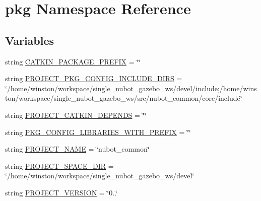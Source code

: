 \hypertarget{namespacepkg}{\section{pkg Namespace Reference}
\label{namespacepkg}
}
\subsection*{Variables}
\begin{DoxyCompactItemize}
\item 
string \hyperlink{namespacepkg_ae26c7a5a06b7d738f4d210ca449e6bee}{C\-A\-T\-K\-I\-N\-\_\-\-P\-A\-C\-K\-A\-G\-E\-\_\-\-P\-R\-E\-F\-I\-X} = \char`\"{}\char`\"{}
\item 
string \hyperlink{namespacepkg_a2760bf8266ff58da440f65ee91b203ab}{P\-R\-O\-J\-E\-C\-T\-\_\-\-P\-K\-G\-\_\-\-C\-O\-N\-F\-I\-G\-\_\-\-I\-N\-C\-L\-U\-D\-E\-\_\-\-D\-I\-R\-S} = \char`\"{}/home/winston/workspace/single\-\_\-nubot\-\_\-gazebo\-\_\-ws/devel/include;/home/winston/workspace/single\-\_\-nubot\-\_\-gazebo\-\_\-ws/src/nubot\-\_\-common/core/include\char`\"{}
\item 
string \hyperlink{namespacepkg_a17c18447fad253ee1c0d76deec88028c}{P\-R\-O\-J\-E\-C\-T\-\_\-\-C\-A\-T\-K\-I\-N\-\_\-\-D\-E\-P\-E\-N\-D\-S} = \char`\"{}\char`\"{}
\item 
string \hyperlink{namespacepkg_a433e30cecb4a0123a7c4b384d168e336}{P\-K\-G\-\_\-\-C\-O\-N\-F\-I\-G\-\_\-\-L\-I\-B\-R\-A\-R\-I\-E\-S\-\_\-\-W\-I\-T\-H\-\_\-\-P\-R\-E\-F\-I\-X} = \char`\"{}\char`\"{}
\item 
string \hyperlink{namespacepkg_a7dfbe99257c26f5e4a3a5483995d9ddc}{P\-R\-O\-J\-E\-C\-T\-\_\-\-N\-A\-M\-E} = \char`\"{}nubot\-\_\-common\char`\"{}
\item 
string \hyperlink{namespacepkg_a3f0f1b4bc03c596525e025539ca4332f}{P\-R\-O\-J\-E\-C\-T\-\_\-\-S\-P\-A\-C\-E\-\_\-\-D\-I\-R} = \char`\"{}/home/winston/workspace/single\-\_\-nubot\-\_\-gazebo\-\_\-ws/devel\char`\"{}
\item 
string \hyperlink{namespacepkg_ab1037914b9286bb61855131c06149648}{P\-R\-O\-J\-E\-C\-T\-\_\-\-V\-E\-R\-S\-I\-O\-N} = \char`\"{}0..\char`\"{}
\end{DoxyCompactItemize}


